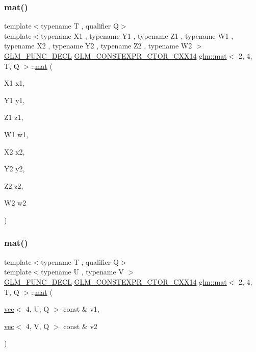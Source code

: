 \subsubsection{\texorpdfstring{mat()}{mat()}\hspace{0.1cm}{\footnotesize\ttfamily [7/21]}}
{\footnotesize\ttfamily template$<$typename T , qualifier Q$>$ \\
template$<$typename X1 , typename Y1 , typename Z1 , typename W1 , typename X2 , typename Y2 , typename Z2 , typename W2 $>$ \\
\hyperlink{setup_8hpp_ab2d052de21a70539923e9bcbf6e83a51}{G\+L\+M\+\_\+\+F\+U\+N\+C\+\_\+\+D\+E\+CL} \hyperlink{setup_8hpp_a0900f9145e68bf6061b6f5e7be3fa751}{G\+L\+M\+\_\+\+C\+O\+N\+S\+T\+E\+X\+P\+R\+\_\+\+C\+T\+O\+R\+\_\+\+C\+X\+X14} \hyperlink{structglm_1_1mat}{glm\+::mat}$<$ 2, 4, T, Q $>$\+::\hyperlink{structglm_1_1mat}{mat} (\begin{DoxyParamCaption}\item[{X1}]{x1,  }\item[{Y1}]{y1,  }\item[{Z1}]{z1,  }\item[{W1}]{w1,  }\item[{X2}]{x2,  }\item[{Y2}]{y2,  }\item[{Z2}]{z2,  }\item[{W2}]{w2 }\end{DoxyParamCaption})}

\mbox{\label{structglm_1_1mat_3_012_00_014_00_01_t_00_01_q_01_4_aa3fa882e6b26c7fc035f8c17e17ff721}} 
\subsubsection{\texorpdfstring{mat()}{mat()}\hspace{0.1cm}{\footnotesize\ttfamily [8/21]}}
{\footnotesize\ttfamily template$<$typename T , qualifier Q$>$ \\
template$<$typename U , typename V $>$ \\
\hyperlink{setup_8hpp_ab2d052de21a70539923e9bcbf6e83a51}{G\+L\+M\+\_\+\+F\+U\+N\+C\+\_\+\+D\+E\+CL} \hyperlink{setup_8hpp_a0900f9145e68bf6061b6f5e7be3fa751}{G\+L\+M\+\_\+\+C\+O\+N\+S\+T\+E\+X\+P\+R\+\_\+\+C\+T\+O\+R\+\_\+\+C\+X\+X14} \hyperlink{structglm_1_1mat}{glm\+::mat}$<$ 2, 4, T, Q $>$\+::\hyperlink{structglm_1_1mat}{mat} (\begin{DoxyParamCaption}\item[{\hyperlink{structglm_1_1vec}{vec}$<$ 4, U, Q $>$ const \&}]{v1,  }\item[{\hyperlink{structglm_1_1vec}{vec}$<$ 4, V, Q $>$ const \&}]{v2 }\end{DoxyParamCaption})}


